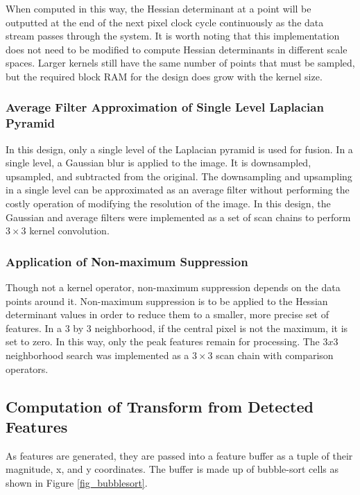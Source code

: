 \documentclass[sigconf]{acmart/acmart}
\begin{document}
When computed in this way, the Hessian determinant at a point will be outputted at the end of the next pixel clock cycle continuously as the data stream passes through the system. It is worth noting that this implementation does not need to be modified to compute Hessian determinants in different scale spaces. Larger kernels still have the same number of points that must be sampled, but the required block RAM for the design does grow with the kernel size.

\subsubsection{Average Filter Approximation of Single Level Laplacian Pyramid}

In this design, only a single level of the Laplacian pyramid is used for fusion. In a single level, a Gaussian blur is applied to the image. It is downsampled, upsampled, and subtracted from the original. The downsampling and upsampling in a single level can be approximated as an average filter without performing the costly operation of modifying the resolution of the image. In this design, the Gaussian and average filters were implemented as a set of scan chains to perform $3 \times 3$ kernel convolution.

\subsubsection{Application of Non-maximum Suppression}

Though not a kernel operator, non-maximum suppression depends on the data points around it. Non-maximum suppression is to be applied to the Hessian determinant values in order to reduce them to a smaller, more precise set of features. In a $3$ by $3$ neighborhood, if the central pixel is not the maximum, it is set to zero. In this way, only the peak features remain for processing. The $3x3$ neighborhood search was implemented as a $3 \times 3$ scan chain with comparison operators.

\subsection{Computation of Transform from Detected Features}

As features are generated, they are passed into a feature buffer as a tuple of their magnitude, x, and y coordinates. The buffer is made up of bubble-sort cells as shown in Figure \ref{fig_bubblesort}.
\end{document}
